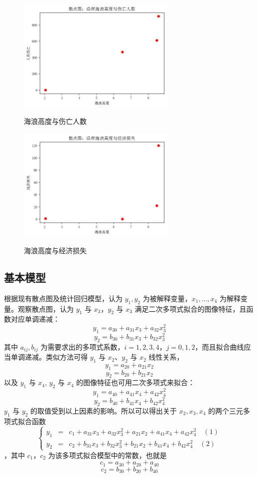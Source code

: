 \documentclass[UTF8]{ctexart}
\begin{document}
\begin{figure}[htbp]
  \begin{minipage}[t]{0.5\linewidth}
    \centering
    \includegraphics[width=3in]{../images/scatter-tsunami-person.png}
    \label{fig:scatter:tsunami-person}
    \caption{海浪高度与伤亡人数}
  \end{minipage}
  \begin{minipage}[t]{0.5\linewidth}
    \centering
    \includegraphics[width=3in]{../images/scatter-tsunami-economy.png}
    \label{fig:scatter:tsunami-economy}
    \caption{海浪高度与经济损失}
\end{minipage}
\end{figure}

\subsection{基本模型}
根据现有散点图及统计回归模型，认为 $y_1, y_2$ 为被解释变量，$x_1, ..., x_4$ 为解释变量。观察散点图，认为 $y_1$ 与 $x_3$，$y_2$ 与 $x_3$ 满足二次多项式拟合的图像特征，且函数对应单调递减：
$$y_1 = a_{30} + a_{31}x_3 + a_{32}x_3^2$$
$$y_2 = b_{30} + b_{31}x_3 + b_{32}x_3^2$$
其中 $a_{ij}, b_{ij}$ 为需要求出的多项式系数，$i = 1, 2, 3, 4$，$j = 0, 1, 2$，而且拟合曲线应当单调递减。类似方法可得 $y_1$ 与 $x_2$、$y_2$ 与 $x_2$ 线性关系，
$$y_1 = a_{20} + a_{21}x_2$$
$$y_2 = b_{20} + b_{21}x_2$$
以及 $y_1$ 与 $x_4$, $y_2$ 与 $x_4$ 的图像特征也可用二次多项式来拟合：
$$y_1 = a_{40} + a_{41}x_4 + a_{42}x_4^2$$
$$y_2 = b_{40} + b_{41}x_4 + b_{42}x_4^2$$
$y_1$ 与 $y_2$ 的取值受到以上因素的影响。所以可以得出关于 $x_2, x_3, x_4$ 的两个三元多项式拟合函数
$$
\left\{
\begin{array}{rcl}
y_1 & = & c_1 + a_{31}x_3 + a_{32}x_3^2 + a_{21}x_2 + a_{41}x_4 + a_{42}x_4^2\quad(1) \\
y_2 & = & c_2 + b_{31}x_3 + b_{32}x_3^2 + b_{21}x_2 + b_{41}x_4 + b_{42}x_4^2\quad(2)
\end{array}
\right.
$$
，其中 $c_1$，$c_2$ 为该多项式拟合模型中的常数，也就是
$$c_1 = a_{30} + a_{20} + a_{40}$$
$$c_2 = b_{30} + b_{20} + b_{40}$$
\end{document}
